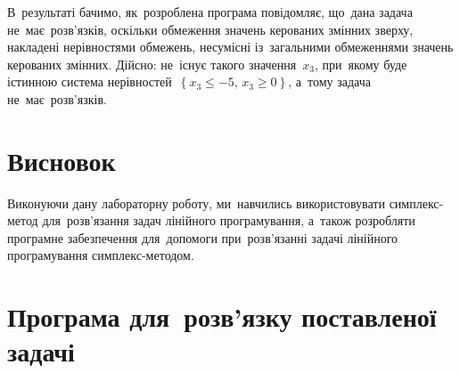 \documentclass[
  a4paper,
  oneside,
  BCOR = 10mm,
  DIV = 12,
  12pt,
  headings = normal,
]{scrartcl}
\begin{document}
    В~результаті бачимо, як~розроблена програма повідомляє, що~дана задача не~має~розв'язків, оскільки обмеження значень керованих змінних зверху, накладені нерівностями обмежень, несумісні із~загальними обмеженнями значень керованих змінних. Дійсно: не~існує такого значення~$x_3$, при~якому буде істинною система нерівностей~$\left\{ x_{3} \leqslant -5, \, x_{3} \geqslant 0\right\}$, а~тому задача не~має~розв'язків.

  \section{Висновок}
    Виконуючи дану лабораторну роботу, ми~навчились використовувати симплекс-метод для~розв'язання задач лінійного програмування, а~також розробляти програмне забезпечення для~допомоги при~розв'язанні задачі лінійного програмування симплекс-методом.

  \appendix
  \section{Програма для~розв'язку поставленої задачі}

\end{document}
